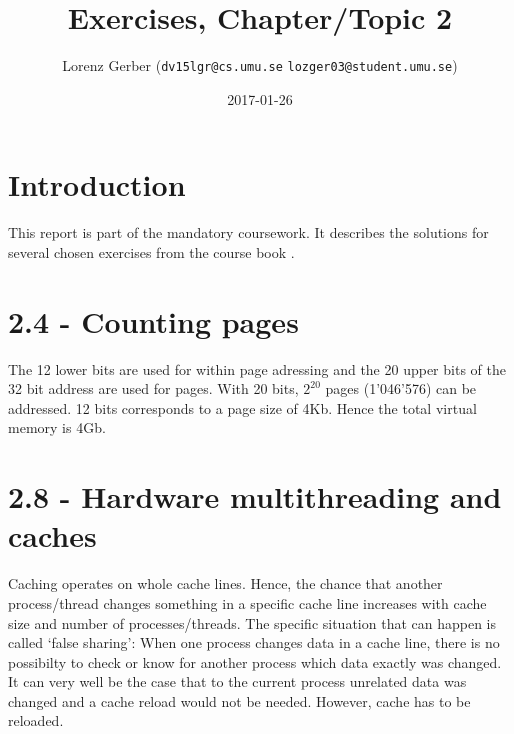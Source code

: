 \documentclass[a4paper,11pt,twoside]{article}
\title{Exercises, Chapter/Topic 2}
\author{Lorenz Gerber ({\tt{dv15lgr@cs.umu.se}} {\tt{lozger03@student.umu.se}})}
\date{2017-01-26}
\begin{document}
\lstset{language=C}
\maketitle
\thispagestyle{empty}
\newpage
\tableofcontents
\thispagestyle{empty}
\newpage

\clearpage
{}

\section{Introduction}
This report is part of the mandatory coursework. It describes the solutions for several chosen exercises from the course book \cite{pacheco2011}.
\section{2.4 - Counting pages}
The 12 lower bits are used for within page adressing and the 20 upper bits of the 32 bit address are used for pages. With 20 bits, $2^{20}$ pages (1'046'576) can be addressed. 12 bits corresponds to a page size of 4Kb. Hence the total virtual memory is 4Gb. 
\section{2.8 - Hardware multithreading and caches}
Caching operates on whole cache lines. Hence, the chance that another process/thread changes something in a specific cache line increases with cache size and number of processes/threads. The specific situation that can happen is called `false sharing': When one process changes data in a cache line, there is no possibilty to check or know for another process which data exactly was changed. It can very well be the case that to the current process unrelated data was changed and a cache reload would not be needed. However, cache has to be reloaded. 
\end{document}
